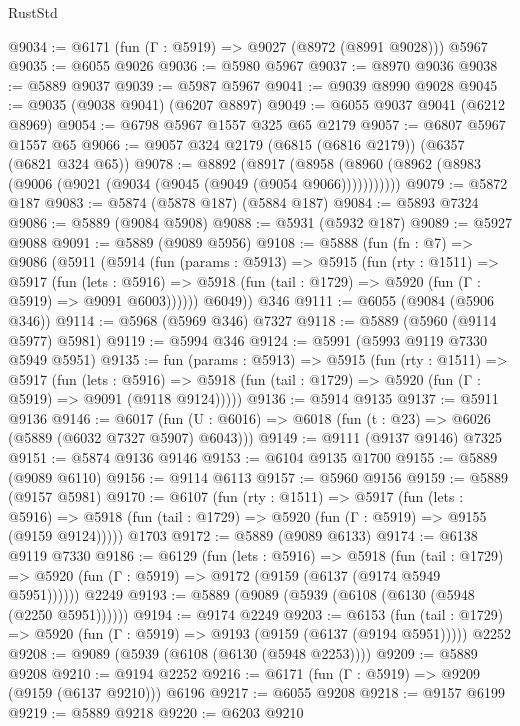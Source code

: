 \begin{lexlean}{RustStd}
\begin{coremodule}
@9034 := @6171 (fun (Γ : @5919) => @9027 (@8972 (@8991 @9028))) @5967
@9035 := @6055 @9026
@9036 := @5980 @5967
@9037 := @8970 @9036
@9038 := @5889 @9037
@9039 := @5987 @5967
@9041 := @9039 @8990 @9028
@9045 := @9035 (@9038 @9041) (@6207 @8897)
@9049 := @6055 @9037 @9041 (@6212 @8969)
@9054 := @6798 @5967 @1557 @325 @65 @2179
@9057 := @6807 @5967 @1557 @65
@9066 := @9057 @324 @2179 (@6815 (@6816 @2179)) (@6357 (@6821 @324 @65))
@9078 := @8892
    (@8917 (@8958 (@8960 (@8962 (@8983 (@9006 (@9021 (@9034 (@9045 (@9049 (@9054 @9066)))))))))))
@9079 := @5872 @187
@9083 := @5874 (@5878 @187) (@5884 @187)
@9084 := @5893 @7324
@9086 := @5889 (@9084 @5908)
@9088 := @5931 (@5932 @187)
@9089 := @5927 @9088
@9091 := @5889 (@9089 @5956)
@9108 := @5888
    (fun (fn : @7) =>
    @9086
      (@5911
        (@5914
          (fun (params : @5913) =>
          @5915
            (fun (rty : @1511) =>
            @5917
              (fun (lets : @5916) =>
              @5918 (fun (tail : @1729) => @5920 (fun (Γ : @5919) => @9091 @6003))))))
        @6049))
    @346
@9111 := @6055 (@9084 (@5906 @346))
@9114 := @5968 (@5969 @346) @7327
@9118 := @5889 (@5960 (@9114 @5977) @5981)
@9119 := @5994 @346
@9124 := @5991 (@5993 @9119 @7330 @5949 @5951)
@9135 := fun (params : @5913) =>
  @5915
    (fun (rty : @1511) =>
    @5917
      (fun (lets : @5916) =>
      @5918 (fun (tail : @1729) => @5920 (fun (Γ : @5919) => @9091 (@9118 @9124)))))
@9136 := @5914 @9135
@9137 := @5911 @9136
@9146 := @6017 (fun (U : @6016) => @6018 (fun (t : @23) => @6026 (@5889 (@6032 @7327 @5907) @6043)))
@9149 := @9111 (@9137 @9146) @7325
@9151 := @5874 @9136 @9146
@9153 := @6104 @9135 @1700
@9155 := @5889 (@9089 @6110)
@9156 := @9114 @6113
@9157 := @5960 @9156
@9159 := @5889 (@9157 @5981)
@9170 := @6107
    (fun (rty : @1511) =>
    @5917
      (fun (lets : @5916) =>
      @5918 (fun (tail : @1729) => @5920 (fun (Γ : @5919) => @9155 (@9159 @9124)))))
    @1703
@9172 := @5889 (@9089 @6133)
@9174 := @6138 @9119 @7330
@9186 := @6129
    (fun (lets : @5916) =>
    @5918
      (fun (tail : @1729) => @5920 (fun (Γ : @5919) => @9172 (@9159 (@6137 (@9174 @5949 @5951))))))
    @2249
@9193 := @5889 (@9089 (@5939 (@6108 (@6130 (@5948 (@2250 @5951))))))
@9194 := @9174 @2249
@9203 := @6153
    (fun (tail : @1729) => @5920 (fun (Γ : @5919) => @9193 (@9159 (@6137 (@9194 @5951)))))
    @2252
@9208 := @9089 (@5939 (@6108 (@6130 (@5948 @2253))))
@9209 := @5889 @9208
@9210 := @9194 @2252
@9216 := @6171 (fun (Γ : @5919) => @9209 (@9159 (@6137 @9210))) @6196
@9217 := @6055 @9208
@9218 := @9157 @6199
@9219 := @5889 @9218
@9220 := @6203 @9210

\end{coremodule}
\end{lexlean}
